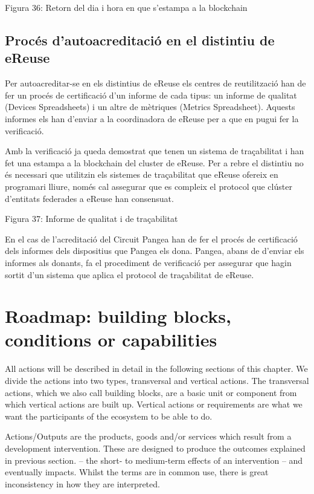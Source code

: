 \documentclass[
]{book}
\begin{document}
Figura 36: Retorn del dia i hora en que s'estampa a la blockchain

\hypertarget{procuxe9s-dautoacreditaciuxf3-en-el-distintiu-de-ereuse}{%
\section{Procés d'autoacreditació en el distintiu de eReuse}\label{procuxe9s-dautoacreditaciuxf3-en-el-distintiu-de-ereuse}}

Per autoacreditar-se en els distintius de eReuse els centres de reutilització han de fer un procés de certificació d'un informe de cada tipus: un informe de qualitat (Devices Spreadsheets) i un altre de mètriques (Metrics Spreadsheet). Aquests informes els han d'enviar a la coordinadora de eReuse per a que en pugui fer la verificació.

Amb la verificació ja queda demostrat que tenen un sistema de traçabilitat i han fet una estampa a la blockchain del cluster de eReuse. Per a rebre el distintiu no és necessari que utilitzin els sistemes de traçabilitat que eReuse ofereix en programari lliure, només cal assegurar que es compleix el protocol que clúster d'entitats federades a eReuse han consensuat.

Figura 37: Informe de qualitat i de traçabilitat

En el cas de l'acreditació del Circuit Pangea han de fer el procés de certificació dels informes dels dispositius que Pangea els dona. Pangea, abans de d'enviar els informes als donants, fa el procediment de verificació per assegurar que hagin sortit d'un sistema que aplica el protocol de traçabilitat de eReuse.

\hypertarget{roadmap-building-blocks-conditions-or-capabilities}{%
\chapter{Roadmap: building blocks, conditions or capabilities}\label{roadmap-building-blocks-conditions-or-capabilities}}

All actions will be described in detail in the following sections of this chapter. We divide the actions into two types, transversal and vertical actions. The transversal actions, which we also call building blocks, are a basic unit or component from which vertical actions are built up. Vertical actions or requirements are what we want the participants of the ecosystem to be able to do.

Actions/Outputs are the products, goods and/or services which result from a development intervention. These are designed to produce the outcomes explained in previous section. -- the short- to medium-term effects of an intervention -- and eventually impacts. Whilst the terms are in common use, there is great inconsistency in how they are interpreted.
\end{document}
